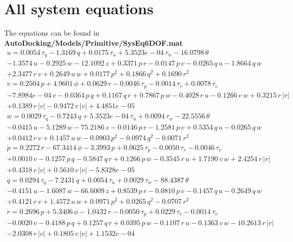 \documentclass[12pt,a4]{article}
\begin{document}
\section{All system equations}
The equations can be found in \textbf{AutoDocking/Models/Primitive/SysEq6DOF.mat}
\begin{multline}
	\dot{u} = 0.0054\,\tau _{q}-1.3169\,q+0.0175\,\tau _{u}+5.3523e-04\,\tau _{w}-16.0798\,\theta \\-1.3574\,u-0.2925\,w-12.1092\,z+0.3371\,p\,r-0.0147\,p\,v-0.0265\,q\,u-1.8664\,q\,w\\+2.3477\,r\,v+0.2649\,u\,w+0.0177\,p^2+0.1866\,q^2+0.1690\,r^2
\end{multline}
\begin{multline}
	\dot{v} = 0.2504\,p+4.9601\,\phi +0.0629\,r-0.0046\,\tau _{p}-0.0014\,\tau _{r}+0.0078\,\tau _{v}\\-7.8984e-04\,v-0.0364\,p\,q+0.1167\,q\,r+0.7867\,p\,w-0.4028\,r\,u-0.1266\,v\,w+0.3215\,r\,\left|r\right|\\+0.1389\,r\,\left|v\right|-0.9472\,v\,\left|v\right|+4.4851e-05
\end{multline}
\begin{multline}
	\dot{w} = 0.0029\,\tau _{q}-0.7243\,q+5.3523e-04\,\tau _{u}+0.0094\,\tau _{w}-22.5556\,\theta \\-0.0415\,u-5.1289\,w-75.2186\,z-0.0146\,p\,r-1.2581\,p\,v+0.5354\,q\,u-0.0265\,q\,w\\+0.0412\,r\,v+0.1457\,u\,w-0.0903\,p^2-0.0974\,q^2-0.0071\,r^2
\end{multline}
\begin{multline}
	\dot{p} = 0.2272\,r-67.3414\,\phi -3.3993\,p+0.0625\,\tau _{p}-0.0050\,\tau _{r}-0.0046\,\tau _{v}\\+0.0010\,v-0.1257\,p\,q-0.5847\,q\,r+0.1266\,p\,w-0.3545\,r\,u+1.7190\,v\,w+2.4254\,r\,\left|r\right|\\+0.4318\,r\,\left|v\right|+0.5610\,v\,\left|v\right|-5.8328e-05
\end{multline}
\begin{multline}
	\dot{q} = 0.0294\,\tau _{q}-7.2431\,q+0.0054\,\tau _{u}+0.0029\,\tau _{w}-88.4387\,\theta \\-0.4151\,u-1.6087\,w-66.6009\,z+0.8539\,p\,r-0.0810\,p\,v-0.1457\,q\,u-0.2649\,q\,w\\+0.4121\,r\,v+1.4572\,u\,w+0.0971\,p^2+0.0265\,q^2-0.0707\,r^2
\end{multline}
\begin{multline}
	\dot{r} = 0.2696\,p+5.3406\,\phi -1.0432\,r-0.0050\,\tau _{p}+0.0229\,\tau _{r}-0.0014\,\tau _{v}\\-0.0020\,v-0.4188\,p\,q+0.1257\,q\,r+0.0395\,p\,w-0.1107\,r\,u-0.1363\,v\,w-10.2613\,r\,\left|r\right|\\-2.0308\,r\,\left|v\right|+0.1805\,v\,\left|v\right|+1.1532e-04
\end{multline}
\end{document}
